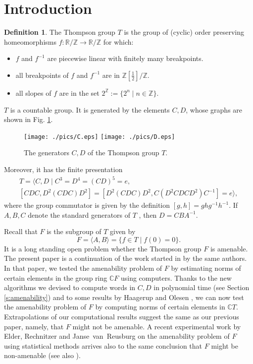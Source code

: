 \documentclass{amsart}
\newcommand{\C}{\mathbb C}
\newcommand{\R}{\mathbb R}
\newcommand{\Z}{\mathbb Z}
\theoremstyle{definition}
\newtheorem{defn}[thm]{Definition}  %
\begin{document}
\maketitle
\section{\textbf{Introduction}}\label{s:one}
\begin{defn}
  The Thompson group $T$ is the group of (cyclic) order preserving homeomorphisms $f:\R/\Z\to \R/\Z$ for which:
  \begin{itemize}
    \item $f$ and $f^{-1}$ are piecewise linear with finitely many breakpoints.
    \item all breakpoints of $f$ and $f^{-1}$ are in $\Z[\tfrac 12]/\Z$.
    \item all slopes of $f$ are in the set $2^{\Z}:=\{2^n\mid n\in\Z\}$.
  \end{itemize}
\end{defn}
$T$ is a countable group. It is generated by the elements $C,D$, whose graphs are shown in Fig. \ref{f:generatorsCDofT}.
\begin{figure}
\texttt{[image: ./pics/C.eps]}\qquad
\texttt{[image: ./pics/D.eps]}\\
  \caption{The generators $C,D$ of the Thompson group $T$.}\label{f:generatorsCDofT}
\end{figure}
Moreover, it has the finite presentation
\begin{multline}
T=\langle C,D\mid C^3=D^4=(CD)^5=e,\\  [CDC, D^2(CDC)D^2]=[D^2(CDC)D^2,C(D^2CDCD^2)C^{-1}]=e\rangle,
\end{multline}
where the group commutator is given by the definition $[g,h]=ghg^{-1}h^{-1}$.
If $A,B,C$ denote the standard generators of $T$ \cite{CFP}, then $D=C B A^{-1}$.

Recall that $F$ is the subgroup of $T$ given by
$$F=\langle A,B\rangle =\{ f\in T \mid f(0)=0\}.$$  
It is a long standing open problem whether the Thompson group $F$ is amenable. 
The present paper is a continuation of the work started in \cite{HaagerupRamirezSolano} by the same authors.
In that paper, we tested the amenability problem of $F$ by
estimating norms of certain elements in the group ring $\C F$ using computers. 
Thanks to the new algorithms we devised to compute words in $C,D$ in polynomial time (see Section \ref{s:amenability}) and to some results by Haagerup and Olesen \cite{HO}, we can now test the amenability problem of $F$ by computing norms of certain elements in $\C T$.
Extrapolations of our computational results suggest the same as our previous paper, namely, that $F$ might not be amenable. A recent experimental work by Elder, Rechnitzer and Janse~van~Reusburg \cite{ElderRechnitzerJanse} on the amenability problem of $F$ using statistical methods arrives also to the same conclusion that $F$ might be non-amenable (see also \cite{ElderRogers}). 
\end{document}
